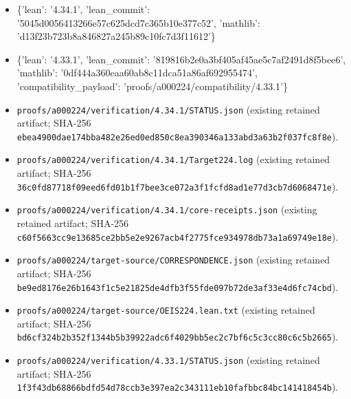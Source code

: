 \documentclass[11pt,a4paper]{article}
\begin{document}
\begin{itemize}
\item \{'lean': '4.34.1', 'lean\_commit': '5045d0056413266e57c625dcd7c365b10e377c52', 'mathlib': 'd13f23b723b8a846827a245b89c10fc7d3f11612'\}
\end{itemize}
\begin{itemize}
\item \{'lean': '4.33.1', 'lean\_commit': '819816b2e0a3bf405af45ae5c7af2491d8f5bee6', 'mathlib': '0df444a360eaa60ab8c11dca51a86af692955474', 'compatibility\_payload': 'proofs/a000224/compatibility/4.33.1'\}
\end{itemize}
\begin{itemize}
\item \texttt{proofs/a000224/verification/4.34.1/STATUS.json} (existing retained artifact; SHA-256 \texttt{ebea4900dae174bba482e26ed0ed850c8ea390346a133abd3a63b2f037fc8f8e}).
\end{itemize}
\begin{itemize}
\item \texttt{proofs/a000224/verification/4.34.1/Target224.log} (existing retained artifact; SHA-256 \texttt{36c0fd87718f09eed6fd01b1f7bee3ce072a3f1fcfd8ad1e77d3cb7d6068471e}).
\end{itemize}
\begin{itemize}
\item \texttt{proofs/a000224/verification/4.34.1/core-receipts.json} (existing retained artifact; SHA-256 \texttt{c60f5663cc9e13685ce2bb5e2e9267acb4f2775fce934978db73a1a69749e18e}).
\end{itemize}
\begin{itemize}
\item \texttt{proofs/a000224/target-source/CORRESPONDENCE.json} (existing retained artifact; SHA-256 \texttt{be9ed8176e26b1643f1c5e21825de4dfb3f55fde097b72de3af33e4d6fc74cbd}).
\end{itemize}
\begin{itemize}
\item \texttt{proofs/a000224/target-source/OEIS224.lean.txt} (existing retained artifact; SHA-256 \texttt{bd6cf324b2b352f1344b5b39922adc6f4029bb5ec2c7bf6c5c3cc80c6c5b2665}).
\end{itemize}
\begin{itemize}
\item \texttt{proofs/a000224/verification/4.33.1/STATUS.json} (existing retained artifact; SHA-256 \texttt{1f3f43db68866bdfd54d78ccb3e397ea2c343111eb10fafbbc84bc141418454b}).
\end{itemize}
\end{document}
